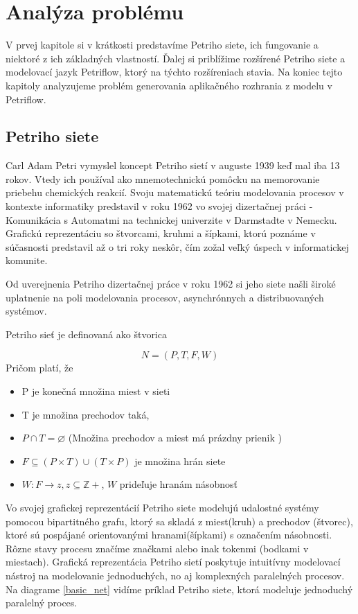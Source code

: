 
\section{Analýza problému}
V prvej kapitole si v krátkosti predstavíme Petriho siete, ich fungovanie a niektoré z  ich základných vlastností. Ďalej si priblížime rozšírené Petriho siete a modelovací jazyk Petriflow, ktorý na týchto rozšíreniach stavia. Na koniec tejto kapitoly analyzujeme problém generovania aplikačného rozhrania z modelu v Petriflow.


\subsection{Petriho siete}
Carl Adam Petri vymyslel koncept Petriho sietí v auguste 1939 keď mal iba 13 rokov. Vtedy ich používal ako mnemotechnickú pomôcku na memorovanie priebehu chemických reakcií. Svoju matematickú teóriu modelovania procesov v kontexte informatiky predstavil v roku 1962 vo svojej dizertačnej práci - Komunikácia s Automatmi na technickej univerzite v Darmstadte v Nemecku. Grafickú reprezentáciu so štvorcami, kruhmi a šípkami, ktorú poznáme v súčasnosti predstavil až o tri roky neskôr, čím zožal veľký úspech v informatickej komunite. \cite{petri50years} 

Od uverejnenia Petriho dizertačnej práce v roku 1962 si jeho siete našli široké uplatnenie na poli modelovania procesov, asynchrónnych a distribuovaných systémov. 

Petriho sieť je definovaná ako štvorica

\[N = (P, T, F, W )\]
Pričom platí, že
\begin{itemize}
\item P je konečná množina miest v sieti
\item T je množina prechodov taká,
\item $P\cap T = \varnothing$ (Množina prechodov a miest má prázdny prienik ) 
\item $F \subseteq (P \times T)\cup(T \times P)$ je množina hrán siete
\item $W: F \rightarrow z, z \subseteq \mathbb Z+$, $W$ prideľuje hranám násobnosť 
\end{itemize}

Vo svojej grafickej reprezentácií Petriho siete modelujú udalostné systémy pomocou bipartitného grafu, ktorý sa skladá z miest(kruh) a prechodov (štvorec), ktoré sú pospájané orientovanými hranami(šípkami) s označením násobnosti. Rôzne stavy procesu značíme značkami alebo inak tokenmi (bodkami v miestach).
Grafická reprezentácia Petriho sietí poskytuje intuitívny modelovací nástroj na modelovanie jednoduchých, no aj komplexných paralelných procesov. Na diagrame \ref{basic_net} vidíme príklad Petriho siete, ktorá modeluje jednoduchý paralelný proces. 

